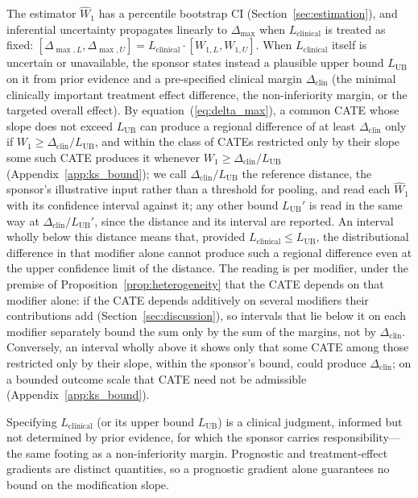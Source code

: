 \documentclass[AMA,Times1COL]{WileyNJDv5}
\begin{document}
The estimator $\widehat{W}_1$ has a percentile bootstrap CI (Section~\ref{sec:estimation}), and inferential uncertainty propagates linearly to $\Delta_{\max}$ when $L_{\text{clinical}}$ is treated as fixed: $[\Delta_{\max,L}, \Delta_{\max,U}] = L_{\text{clinical}} \cdot [W_{1,L}, W_{1,U}]$. When $L_{\text{clinical}}$ itself is uncertain or unavailable, the sponsor states instead a plausible upper bound $L_{\text{UB}}$ on it from prior evidence and a pre-specified clinical margin $\Delta_{\text{clin}}$ (the minimal clinically important treatment effect difference, the non-inferiority margin, or the targeted overall effect). By equation~(\ref{eq:delta_max}), a common CATE whose slope does not exceed $L_{\text{UB}}$ can produce a regional difference of at least $\Delta_{\text{clin}}$ only if $W_1 \geq \Delta_{\text{clin}} / L_{\text{UB}}$, and within the class of CATEs restricted only by their slope some such CATE produces it whenever $W_1 \geq \Delta_{\text{clin}} / L_{\text{UB}}$ (Appendix~\ref{app:ks_bound}); we call $\Delta_{\text{clin}} / L_{\text{UB}}$ the reference distance, the sponsor's illustrative input rather than a threshold for pooling, and read each $\widehat{W}_1$ with its confidence interval against it; any other bound $L_{\text{UB}}'$ is read in the same way at $\Delta_{\text{clin}} / L_{\text{UB}}'$, since the distance and its interval are reported. An interval wholly below this distance means that, provided $L_{\text{clinical}} \leq L_{\text{UB}}$, the distributional difference in that modifier alone cannot produce such a regional difference even at the upper confidence limit of the distance. The reading is per modifier, under the premise of Proposition~\ref{prop:heterogeneity} that the CATE depends on that modifier alone: if the CATE depends additively on several modifiers their contributions add (Section~\ref{sec:discussion}), so intervals that lie below it on each modifier separately bound the sum only by the sum of the margins, not by $\Delta_{\text{clin}}$. Conversely, an interval wholly above it shows only that some CATE among those restricted only by their slope, within the sponsor's bound, could produce $\Delta_{\text{clin}}$; on a bounded outcome scale that CATE need not be admissible (Appendix~\ref{app:ks_bound}).

Specifying $L_{\text{clinical}}$ (or its upper bound $L_{\text{UB}}$) is a clinical judgment, informed but not determined by prior evidence, for which the sponsor carries responsibility---the same footing as a non-inferiority margin. Prognostic and treatment-effect gradients are distinct quantities,\cite{ballman2015,kent2020} so a prognostic gradient alone guarantees no bound on the modification slope.
\end{document}
